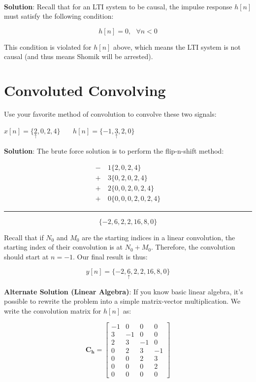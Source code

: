 \documentclass{article}
\begin{document}
\

\noindent \textbf{Solution}: Recall that for an LTI system to be causal, the impulse response $h[n]$ must satisfy the following condition:

$$h[n] = 0, \ \ \ \forall n < 0$$

\noindent This condition is violated for $h[n]$ above, which means the LTI system is not causal (and thus means Shomik will be arrested).

\newpage

\section{Convoluted Convolving}
Use your favorite method of convolution to convolve these two signals:
\newline
\begin{center}
$x[n]=\{\underset{\uparrow}{2},0,2,4\}$ \ \ \ $h[n]=\{-1,\underset{\uparrow}{3},2,0\}$
\end{center}

\noindent \textbf{Solution}: The brute force solution is to perform the flip-n-shift method:

\[
\begin{split}
     - & \ 1\{2, 0, 2, 4 \} \\
     + & \ 3\{0, 2, 0, 2, 4\} \\
     + & \ 2\{0, 0, 2, 0, 2, 4\} \\
     + & \ 0\{0, 0, 0, 2, 0, 2, 4\}
\end{split}
\]
\begin{center}
\par\noindent\rule{100pt}{0.4pt}
\end{center}

$$\{ -2, 6, 2, 2, 16, 8, 0\}$$

\noindent Recall that if $N_0$ and $M_0$ are the starting indices in a linear convolution, the starting index of their convolution is at $N_0 + M_0$. Therefore, the convolution should start at $n=-1$. Our final result is thus:

$$y[n] = \{ -2, \underset{\uparrow}{6}, 2, 2, 16, 8, 0\}$$

\newpage

\noindent \textbf{Alternate Solution (Linear Algebra)}: If you know basic linear algebra, it's possible to rewrite the problem into a simple matrix-vector multiplication. We write the convolution matrix for $h[n]$ as:

$$\mathbf{C_h} = 
  \begin{bmatrix} 
  -1 & 0 & 0 & 0 \\
  3 & -1 & 0 & 0 \\
  2 & 3 & -1 & 0 \\
  0 & 2 & 3 & -1 \\
  0 & 0 & 2 & 3 \\
  0 & 0 & 0 & 2 \\
  0 & 0 & 0 & 0 
  \end{bmatrix}
$$
\end{document}
